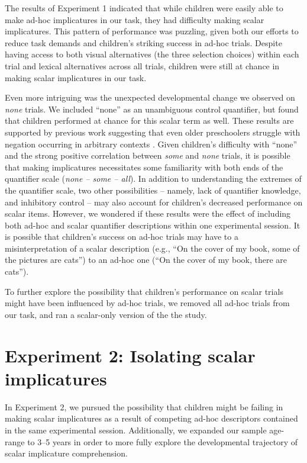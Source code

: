 \documentclass[man]{apa2}
\begin{document}
The results of Experiment 1 indicated that while children were easily able to make ad-hoc implicatures in our task, they had difficulty making scalar implicatures. This pattern of performance was puzzling, given both our efforts to reduce task demands and children's striking success in ad-hoc trials. Despite having access to both visual alternatives (the three selection choices) within each trial and lexical alternatives across all trials, children were still at chance in making scalar implicatures in our task. 

Even more intriguing was the unexpected developmental change we observed on \textit{none} trials. We included ``none'' as an unambiguous control quantifier, but found that children performed at chance for this scalar term as well. These results are supported by previous work suggesting that even older preschoolers struggle with negation occurring in arbitrary contexts \cite{nordmeyer2014}. Given children's difficulty with ``none'' and the strong positive correlation between \textit{some} and \textit{none} trials, it is possible that making implicatures necessitates some familiarity with both ends of the quantifier scale (\textit{none -- some -- all}). In addition to understanding the extremes of the quantifier scale, two other possibilities -- namely, lack of quantifier knowledge, and inhibitory control -- may also account for children's decreased performance on scalar items. However, we wondered if these results were the effect of including both ad-hoc and scalar quantifier descriptions within one experimental session. It is possible that children's success on ad-hoc trials may have to a misinterpretation of a scalar description (e.g., ``On the cover of my book, some of the pictures are cats'') to an ad-hoc one (``On the cover of my book, there are cats''). 

To further explore the possibility that children's performance on scalar trials might have been influenced by ad-hoc trials, we removed all ad-hoc trials from our task, and ran a scalar-only version of the the study.

\section{Experiment 2: Isolating scalar implicatures}
In Experiment 2, we pursued the possibility that children might be failing in making scalar implicatures as a result of competing ad-hoc descriptors contained in the same experimental session. Additionally, we expanded our sample age-range to 3--5 years in order to more fully explore the developmental trajectory of scalar implicature comprehension. 
\end{document}
